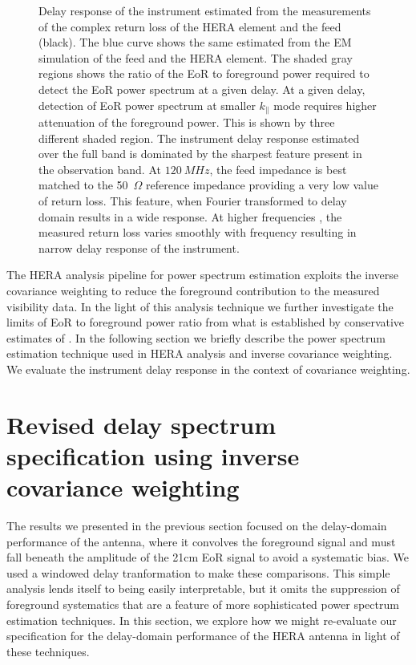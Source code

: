 \documentclass[twocolumn]{emulateapj}
\begin{document}
\begin{figure}[ht]
    \caption{Delay response of the instrument estimated from the measurements of the complex return loss of the HERA element and the feed (black). The blue curve shows the same estimated from the EM simulation of the feed and the HERA element. The shaded gray regions shows the ratio of the EoR to foreground power required to detect the EoR power spectrum at a given delay. At a given delay, detection of EoR power spectrum at smaller $k_{\parallel}$ mode requires higher attenuation of the foreground power. This is shown by three different shaded region. The instrument delay response estimated over the full band is dominated by the sharpest feature present in the observation band. At $120~MHz$, the feed impedance is best matched to the 50~$\Omega$ reference impedance providing a very low value of return loss. This feature, when Fourier transformed to delay domain results in a wide response.  At higher frequencies , the measured return loss varies smoothly with frequency resulting in narrow delay response of the instrument. }   
    \label{ds_full_sub_band}
    \end{figure}
 The HERA analysis pipeline for power spectrum estimation exploits the inverse covariance weighting to reduce the foreground contribution to the measured visibility data. In the light of this analysis technique we further investigate the limits of EoR to foreground power ratio from what is established by conservative estimates of \cite{Thyagarajan_et_al2016}. In the following section we briefly describe the power spectrum estimation technique used in HERA analysis and inverse covariance weighting. We evaluate the instrument delay response in the context of covariance weighting.

   \section{\textbf{Revised delay spectrum specification using inverse covariance weighting}}    
    The results we presented in the previous section focused on the delay-domain performance of
the antenna, where it convolves the foreground signal and must fall beneath the amplitude of the 
21cm EoR signal to avoid a systematic bias.  We used a windowed delay tranformation to make these comparisons.
This simple analysis lends itself to being easily interpretable, but it omits the 
suppression of foreground systematics that are a feature of more sophisticated power spectrum estimation techniques.
In this section, we explore how we might re-evaluate our specification for the delay-domain performance of
the HERA antenna in light of these techniques.
\end{document}
